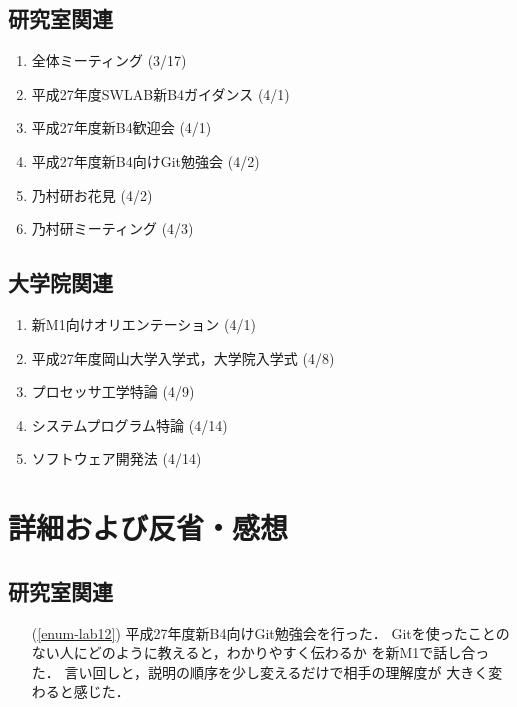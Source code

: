 \documentclass[fleqn, 14pt]{extarticle}
\begin{document}
\subsection{研究室関連}
\label{sec-2-2}
\begin{enumerate}
\item 全体ミーティング 
\hfill
\label{enum-lab1}
(3/17)

\label{sec-2-2}
\item 平成27年度SWLAB新B4ガイダンス
\hfill
\label{enum-lab1}
(4/1)

\label{sec-2-2}
\item 平成27年度新B4歓迎会 
\hfill
\label{enum-lab1}
(4/1)

\label{sec-2-2}
\item 平成27年度新B4向けGit勉強会
\hfill
\label{enum-lab12}
(4/2)

\item 乃村研お花見
\hfill
\label{enum-18}
(4/2)

\item 乃村研ミーティング
\hfill
\label{enum-18}
(4/3)

\end{enumerate}

\subsection{大学院関連}
\label{sec2-3}
\begin{enumerate}
    \item 新M1向けオリエンテーション
    \hfill
    \label{enum-univ2}
    (4/1)

    \item 平成27年度岡山大学入学式，大学院入学式
    \hfill
    \label{enum-univ2}
    (4/8)

    \item プロセッサ工学特論
    \hfill
    \label{enum-univ2}
    (4/9)
    \item システムプログラム特論
    \hfill
    \label{enum-univ2}
    (4/14)
    \item ソフトウェア開発法
    \hfill
    \label{enum-univ2}
    (4/14)
\end{enumerate}

\section{詳細および反省・感想}
\label{sec-3}
\setcounter{subsection}{1}
\subsection{研究室関連}
\label{sec-3-1}
\begin{itemize}
\item[(\ref{enum-lab12})]
    平成27年度新B4向けGit勉強会を行った．
    Gitを使ったことのない人にどのように教えると，わかりやすく伝わるか
    を新M1で話し合った．
    言い回しと，説明の順序を少し変えるだけで相手の理解度が
    大きく変わると感じた．
\end{itemize}
\end{document}
